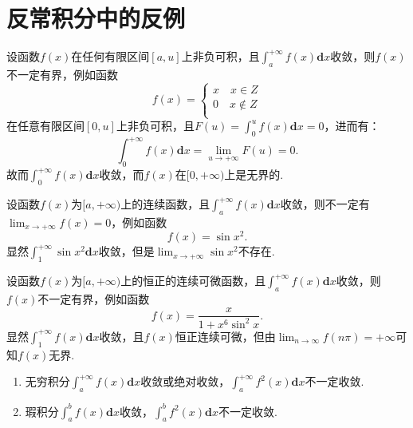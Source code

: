 \section{反常积分中的反例}

\begin{proposition}
	设函数$f(x)$在任何有限区间$[a,u]$上非负可积，且$\int_{a}^{+\infty}f(x)\textbf{d}x$收敛，则$f(x)$不一定有界，例如函数
	\begin{equation}
		f(x) = \left\{
		\begin{aligned}
			x \quad x\in Z \\
		    0 \quad x\not\in Z\\
		\end{aligned}
		\right
		.
	\end{equation}
	在任意有限区间$[0,u]$上非负可积，且$F(u)=\int_{0}^{u}f(x)\textbf{d}x=0$，进而有：
	\begin{equation}
		\int_{0}^{+\infty}f(x)\textbf{d}x = \displaystyle\lim_{u\to +\infty}F(u) = 0.
	\end{equation}
	故而$\int_{0}^{+\infty}f(x)\textbf{d}x$收敛，而$f(x)$在$[0,+\infty)$上是无界的.
\end{proposition}

\begin{proposition}
	设函数$f(x)$为$[a,+\infty)$上的连续函数，且$\int_{a}^{+\infty}f(x)\textbf{d}x$收敛，则不一定有$\displaystyle\lim_{x\to +\infty}f(x) = 0$，例如函数
	\begin{equation}
		f(x) = \sin{x^2}.
	\end{equation}
	显然$\int_{1}^{+\infty}\sin{x^2}\textbf{d}x$收敛，但是$\displaystyle\lim_{x\to +\infty}\sin{x^2}$不存在.
\end{proposition}


\begin{proposition}
	设函数$f(x)$为$[a,+\infty)$上的恒正的连续可微函数，且$\int_{a}^{+\infty}f(x)\textbf{d}x$收敛，则$f(x)$不一定有界，例如函数
	\begin{equation}
		f(x) = \dfrac{x}{1+x^6\sin^2{x}}.
	\end{equation}
	显然$\int_{1}^{+\infty}f(x)\textbf{d}x$收敛，且$f(x)$恒正连续可微，但由$\displaystyle\lim_{n\to \infty}f(n\pi) = +\infty$可知$f(x)$无界.
\end{proposition}


\begin{proposition}
	\begin{enumerate}
		\item 无穷积分$\int_{a}^{+\infty}f(x)\textbf{d}x$收敛或绝对收敛，$\int_{a}^{+\infty}f^2(x)\textbf{d}x$不一定收敛.
		\item 瑕积分$\int_{a}^{b}f(x)\textbf{d}x$收敛，$\int_{a}^{b}f^2(x)\textbf{d}x$不一定收敛.
	\end{enumerate}
\end{proposition}













